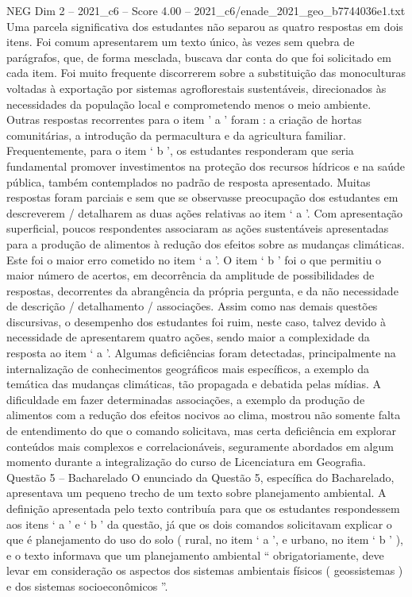\begin{textsample}{NEG Dim 2 – 2021\_c6 – Score 4.00 – 2021\_c6/enade\_2021\_geo\_b7744036e1.txt}
Uma parcela significativa dos estudantes não separou as quatro respostas em dois itens.
Foi comum apresentarem um texto único, às vezes sem quebra de parágrafos, que, de forma mesclada, buscava dar conta do que foi solicitado em cada item.
Foi muito frequente discorrerem sobre a substituição das monoculturas voltadas à exportação por sistemas agroflorestais sustentáveis, direcionados às necessidades da população local e comprometendo menos o meio ambiente.
Outras respostas recorrentes para o item ’ a ’ foram : a criação de hortas comunitárias, a introdução da permacultura e da agricultura familiar.
Frequentemente, para o item ‘ b ’, os estudantes responderam que seria fundamental promover investimentos na proteção dos recursos hídricos e na saúde pública, também contemplados no padrão de resposta apresentado.
Muitas respostas foram parciais e sem que se observasse preocupação dos estudantes em descreverem / detalharem as duas ações relativas ao item ‘ a ’.
Com apresentação superficial, poucos respondentes associaram as ações sustentáveis apresentadas para a produção de alimentos à redução dos efeitos sobre as mudanças climáticas.
Este foi o maior erro cometido no item ‘ a ’.
O item ‘ b ’ foi o que permitiu o maior número de acertos, em decorrência da amplitude de possibilidades de respostas, decorrentes da abrangência da própria pergunta, e da não necessidade de descrição / detalhamento / associações.
Assim como nas demais questões discursivas, o desempenho dos estudantes foi ruim, neste caso, talvez devido à necessidade de apresentarem quatro ações, sendo maior a complexidade da resposta ao item ‘ a ’.
Algumas deficiências foram detectadas, principalmente na internalização de conhecimentos geográficos mais específicos, a exemplo da temática das mudanças climáticas, tão propagada e debatida pelas mídias.
A dificuldade em fazer determinadas associações, a exemplo da produção de alimentos com a redução dos efeitos nocivos ao clima, mostrou não somente falta de entendimento do que o comando solicitava, mas certa deficiência em explorar conteúdos mais complexos e correlacionáveis, seguramente abordados em algum momento durante a integralização do curso de Licenciatura em Geografia.
Questão 5 – Bacharelado O enunciado da Questão 5, específica do Bacharelado, apresentava um pequeno trecho de um texto sobre planejamento ambiental.
A definição apresentada pelo texto contribuía para que os estudantes respondessem aos itens ‘ a ’ e ‘ b ’ da questão, já que os dois comandos solicitavam explicar o que é planejamento do uso do solo ( rural, no item ‘ a ’, e urbano, no item ‘ b ’ ), e o texto informava que um planejamento ambiental “ obrigatoriamente, deve levar em consideração os aspectos dos sistemas ambientais físicos ( geossistemas ) e dos sistemas socioeconômicos ”.

\end{textsample}
